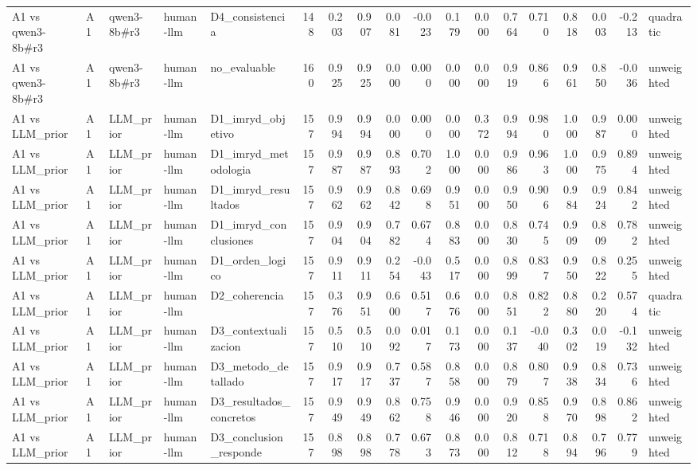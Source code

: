 \begin{table}
{\begin{tabular}{lllllrrrrrrrrrrrrl}
A1 vs qwen3-8b\#r3 & A1 & qwen3-8b\#r3 & human-llm & D4\_consistencia & 148 & 0.203 & 0.907 & 0.081 & -0.023 & 0.179 & 0.000 & 0.764 & 0.710 & 0.818 & 0.003 & -0.213 & quadratic \\
A1 vs qwen3-8b\#r3 & A1 & qwen3-8b\#r3 & human-llm & no\_evaluable & 160 & 0.925 & 0.925 & 0.000 & 0.000 & 0.000 & 0.000 & 0.919 & 0.866 & 0.961 & 0.850 & -0.036 & unweighted \\
A1 vs LLM\_prior & A1 & LLM\_prior & human-llm & D1\_imryd\_objetivo & 157 & 0.994 & 0.994 & 0.000 & 0.000 & 0.000 & 0.372 & 0.994 & 0.980 & 1.000 & 0.987 & 0.000 & unweighted \\
A1 vs LLM\_prior & A1 & LLM\_prior & human-llm & D1\_imryd\_metodologia & 157 & 0.987 & 0.987 & 0.893 & 0.702 & 1.000 & 0.000 & 0.986 & 0.963 & 1.000 & 0.975 & 0.894 & unweighted \\
A1 vs LLM\_prior & A1 & LLM\_prior & human-llm & D1\_imryd\_resultados & 157 & 0.962 & 0.962 & 0.842 & 0.698 & 0.951 & 0.000 & 0.950 & 0.906 & 0.984 & 0.924 & 0.842 & unweighted \\
A1 vs LLM\_prior & A1 & LLM\_prior & human-llm & D1\_imryd\_conclusiones & 157 & 0.904 & 0.904 & 0.782 & 0.674 & 0.883 & 0.000 & 0.830 & 0.745 & 0.909 & 0.809 & 0.782 & unweighted \\
A1 vs LLM\_prior & A1 & LLM\_prior & human-llm & D1\_orden\_logico & 157 & 0.911 & 0.911 & 0.254 & -0.043 & 0.517 & 0.000 & 0.899 & 0.837 & 0.950 & 0.822 & 0.255 & unweighted \\
A1 vs LLM\_prior & A1 & LLM\_prior & human-llm & D2\_coherencia & 157 & 0.376 & 0.951 & 0.600 & 0.517 & 0.676 & 0.000 & 0.851 & 0.822 & 0.880 & 0.220 & 0.574 & quadratic \\
A1 vs LLM\_prior & A1 & LLM\_prior & human-llm & D3\_contextualizacion & 157 & 0.510 & 0.510 & 0.092 & 0.017 & 0.173 & 0.000 & 0.137 & -0.040 & 0.302 & 0.019 & -0.132 & unweighted \\
A1 vs LLM\_prior & A1 & LLM\_prior & human-llm & D3\_metodo\_detallado & 157 & 0.917 & 0.917 & 0.737 & 0.587 & 0.858 & 0.000 & 0.879 & 0.807 & 0.938 & 0.834 & 0.736 & unweighted \\
A1 vs LLM\_prior & A1 & LLM\_prior & human-llm & D3\_resultados\_concretos & 157 & 0.949 & 0.949 & 0.862 & 0.758 & 0.946 & 0.000 & 0.920 & 0.858 & 0.970 & 0.898 & 0.862 & unweighted \\
A1 vs LLM\_prior & A1 & LLM\_prior & human-llm & D3\_conclusion\_responde & 157 & 0.898 & 0.898 & 0.778 & 0.673 & 0.873 & 0.000 & 0.812 & 0.718 & 0.894 & 0.796 & 0.779 & unweighted \\

\end{tabular}}
\end{table}
